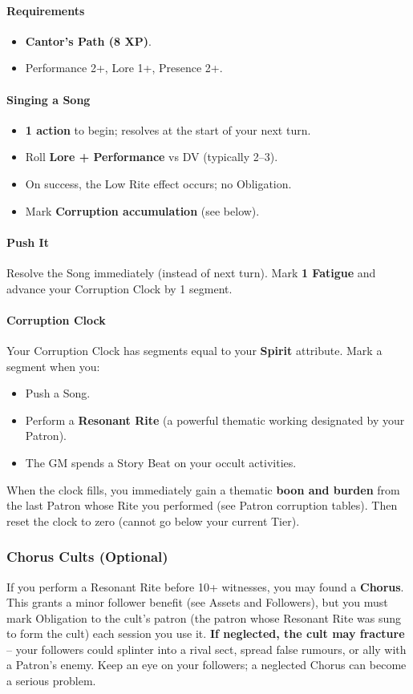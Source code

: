 \paragraph{Requirements}
\begin{itemize}
  \item \textbf{Cantor's Path (8 XP)}.
  \item Performance 2+, Lore 1+, Presence 2+.
\end{itemize}

\paragraph{Singing a Song}
\begin{itemize}
  \item \textbf{1 action} to begin; resolves at the start of your next turn.
  \item Roll \textbf{Lore + Performance} vs DV (typically 2--3).
  \item On success, the Low Rite effect occurs; no Obligation.
  \item Mark \textbf{Corruption accumulation} (see below).
\end{itemize}

\paragraph{Push It}
Resolve the Song immediately (instead of next turn). Mark \textbf{1 Fatigue} and advance your Corruption Clock by 1 segment.

\paragraph{Corruption Clock}
Your Corruption Clock has segments equal to your \textbf{Spirit} attribute. Mark a segment when you:
\begin{itemize}
  \item Push a Song.
  \item Perform a \textbf{Resonant Rite} (a powerful thematic working designated by your Patron).
  \item The GM spends a Story Beat on your occult activities.
\end{itemize}
When the clock fills, you immediately gain a thematic \textbf{boon and burden} from the last Patron whose Rite you performed (see Patron corruption tables). Then reset the clock to zero (cannot go below your current Tier).

\subsubsection*{Chorus Cults (Optional)}
If you perform a Resonant Rite before 10+ witnesses, you may found a \textbf{Chorus}. This grants a minor follower benefit (see Assets and Followers), but you must mark Obligation to the cult's patron (the patron whose Resonant Rite was sung to form the cult) each session you use it. \textbf{If neglected, the cult may fracture} -- your followers could splinter into a rival sect, spread false rumours, or ally with a Patron's enemy. Keep an eye on your followers; a neglected Chorus can become a serious problem.

